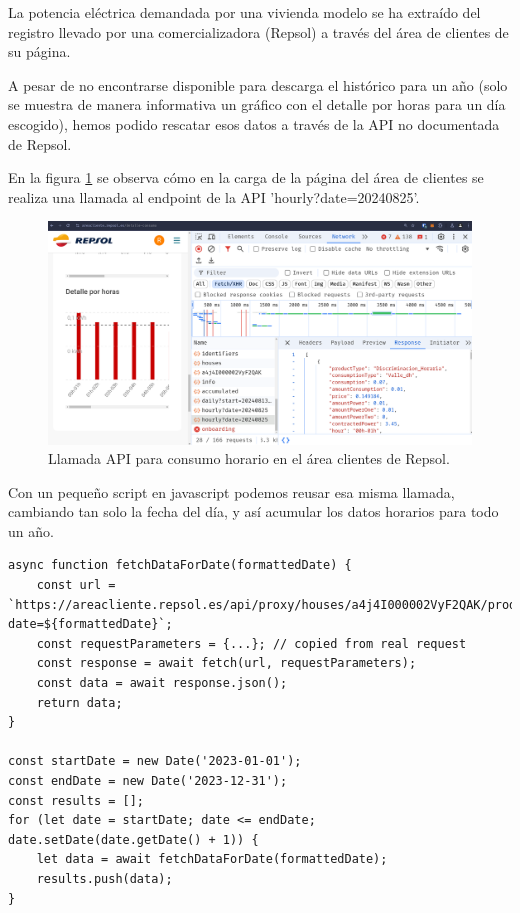 La potencia eléctrica demandada por una vivienda modelo se ha extraído del
registro llevado por una comercializadora (Repsol) a través del área de
clientes de su página.

A pesar de no encontrarse disponible para descarga el histórico para un año
(solo se muestra de manera informativa un gráfico con el detalle por horas para
un día escogido), hemos podido rescatar esos datos a través de la API no
documentada de Repsol.

En la figura \ref{fig:repsol_api} se observa cómo en la carga de la página del
área de clientes se realiza una llamada al endpoint de la API
'hourly?date=20240825'.

\begin{figure}[h] \centering
	\centering
	\includegraphics[width=1\textwidth]{./capitulos/adquisicion_de_datos/images/repsol_api.png}
	\caption{Llamada API para consumo horario en el área clientes de Repsol.}
	\label{fig:repsol_api}
\end{figure}

Con un pequeño script en javascript podemos reusar esa misma llamada, cambiando
tan solo la fecha del día, y así acumular los datos horarios para todo un año.

\begin{verbatim}
async function fetchDataForDate(formattedDate) {
    const url = `https://areacliente.repsol.es/api/proxy/houses/a4j4I000002VyF2QAK/products/4302580717/consumption/hourly?date=${formattedDate}`;
    const requestParameters = {...}; // copied from real request
    const response = await fetch(url, requestParameters);
    const data = await response.json();
    return data;
}

const startDate = new Date('2023-01-01');
const endDate = new Date('2023-12-31');
const results = [];
for (let date = startDate; date <= endDate; date.setDate(date.getDate() + 1)) {
    let data = await fetchDataForDate(formattedDate);
    results.push(data);
}
\end{verbatim}

